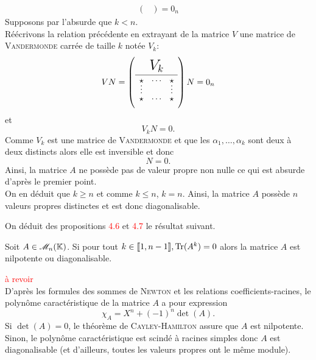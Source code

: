 \begin{preuve}
\begin{itemize}
\begin{align*}
\begin{pmatrix}
            \end{pmatrix}
            =
            0_n
        \end{align*}
        Supposons par l'absurde que $k < n$. \\
        Réécrivons la relation précédente en extrayant de la matrice $V$ une matrice de \textsc{Vandermonde} carrée de taille $k$ notée $V_k$:
        $$V N = \vandermondepartiel N = 0_n$$
        et
        $$V_k N = 0.$$
        Comme $V_k$ est une matrice de \textsc{Vandermonde} et que les $\alpha_1, \dots, \alpha_k$ sont deux à deux distincts alors elle est inversible et donc
        $$N = 0.$$
        Ainsi, la matrice $A$ ne possède pas de valeur propre non nulle ce qui est absurde d'après le premier point. \\
        On en déduit que $k \geqslant n$ et comme $k \leqslant n$, $k=n$. Ainsi, la matrice $A$ possède $n$ valeurs propres distinctes et est donc diagonalisable.
    \end{itemize}
\end{preuve}

On déduit des propositions \textcolor{red}{4.6} et \textcolor{red}{4.7} le résultat suivant.
\begin{prop}
    Soit $A \in \mathscr{M}_n(\mathbb{K})$. Si pour tout $k \in \llbracket 1, n-1 \rrbracket, \mathrm{Tr}(A^k) = 0$ alors la matrice $A$ est nilpotente ou diagonalisable.
\end{prop}


\begin{preuve}
    \textcolor{red}{à revoir} \\
    D'après les formules des sommes de \textsc{Newton} et les relations coefficients-racines, le polynôme caractéristique de la matrice $A$ a pour expression
    $$\chi_A = X^n + (-1)^n \det(A).$$
    Si $\det(A) = 0$, le théorème de \textsc{Cayley}-\textsc{Hamilton} assure que $A$ est nilpotente. Sinon, le polynôme caractéristique est scindé à racines simples donc $A$ est diagonalisable (et d'ailleurs, toutes les valeurs propres ont le même module).
\end{preuve}
